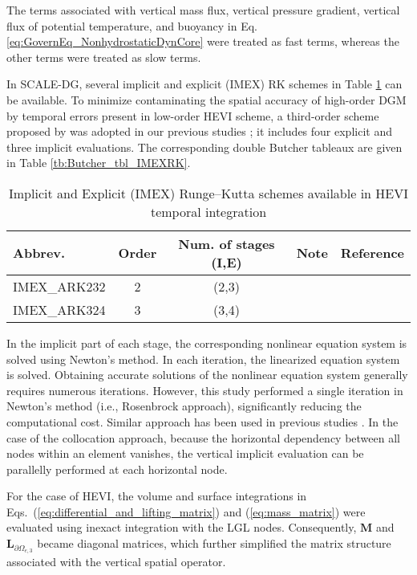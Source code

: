 The terms associated with 
vertical mass flux, 
vertical pressure gradient, 
vertical flux of potential temperature, 
and buoyancy in Eq.\,\eqref{eq:GovernEq_NonhydrostaticDynCore} were treated as fast terms, 
whereas the other terms were treated as slow terms. 


In SCALE-DG, 
several implicit and explicit (IMEX) RK schemes in Table \ref{tb:HEVI_temporal_integ_choice} can be available. 
To minimize contaminating the spatial accuracy of high-order DGM by temporal errors present in low-order HEVI scheme, 
a third-order scheme proposed by \cite{kennedy2003additive} was adopted in our previous studies \citep{KT2025SCALEDG};  
it includes four explicit and three implicit evaluations. 
The corresponding double Butcher tableaux are given in Table \ref{tb:Butcher_tbl_IMEXRK}. 

\begin{table}[t]
\caption{Implicit and Explicit (IMEX) Runge--Kutta schemes available in HEVI temporal integration}
\begin{tabular}{l|cccc}
\hline
Abbrev. & Order & Num. of stages (I,E) & Note & Reference \\
\hline
IMEX\_ARK232 & 2 & (2,3) &  & \cite{Giraldo2013} \\
\hline
IMEX\_ARK324 & 3 & (3,4) &  & \cite{kennedy2003additive} \\
\hline
\end{tabular}
\label{tb:HEVI_temporal_integ_choice}
\end{table}


In the implicit part of each stage, 
the corresponding nonlinear equation system is solved using Newton's method. 
In each iteration, the linearized equation system is solved. 
Obtaining accurate solutions of the nonlinear equation system generally requires numerous iterations. 
However, 
this study performed a single iteration in Newton's method (i.e., Rosenbrock approach), 
significantly reducing the computational cost. 
Similar approach has been used in previous studies \citep{Ullrich2012Resenbrock}. 
In the case of the collocation approach, 
because the horizontal dependency between all nodes within an element vanishes,  
the vertical implicit evaluation can be parallelly performed at each horizontal node. 


For the case of HEVI, 
the volume and surface integrations in Eqs.~(\ref{eq:differential_and_lifting_matrix}) and (\ref{eq:mass_matrix}) 
were evaluated using inexact integration with the LGL nodes. 
Consequently, $\bm{M}$ and $\bm{L}_{\partial \Omega_{e,3}}$ became diagonal matrices, 
which further simplified the matrix structure associated with the vertical spatial operator. 


